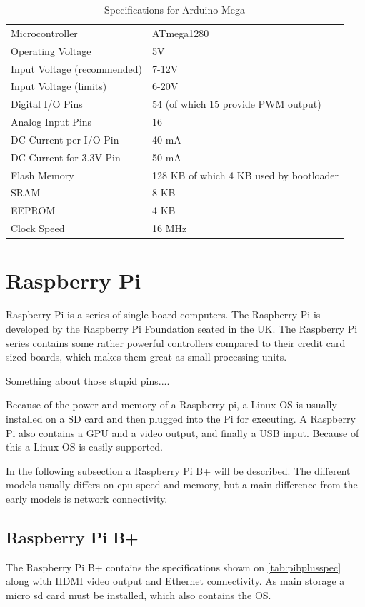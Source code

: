 \begin{table}[h!]
\begin{tabular}{| l | l |}
\hline
Microcontroller & ATmega1280\\
Operating Voltage & 5V\\
Input Voltage (recommended) & 7-12V\\
Input Voltage (limits) & 6-20V\\
Digital I/O Pins & 54 (of which 15 provide PWM output)\\
Analog Input Pins & 16\\
DC Current per I/O Pin & 40 mA\\
DC Current for 3.3V Pin & 50 mA\\
Flash Memory & 128 KB of which 4 KB used by bootloader\\
SRAM & 8 KB\\
EEPROM & 4 KB\\
Clock Speed & 16 MHz\\
\hline
\end{tabular}
\caption{Specifications for Arduino Mega}
\end{table}
\label{tab:megaspec}

\section{Raspberry Pi}
Raspberry Pi is a series of single board computers. The Raspberry Pi is developed by the Raspberry Pi Foundation seated in the UK. The Raspberry Pi series contains some rather powerful controllers compared to their credit card sized boards, which makes them great as small processing units.

Something about those stupid pins....

Because of the power and memory of a Raspberry pi, a Linux OS is usually installed on a SD card and then plugged into the Pi for executing. A Raspberry Pi also contains a GPU and a video output, and finally a USB input. Because of this a Linux OS is easily supported.

In the following subsection a Raspberry Pi B+ will be described. The different models usually differs on cpu speed and memory, but a main difference from the early models is network connectivity.

\subsection{Raspberry Pi B+}
The Raspberry Pi B+ contains the specifications shown on \ref{tab:pibplusspec} along with HDMI video output and Ethernet connectivity. As main storage a micro sd card must be installed, which also contains the OS.



